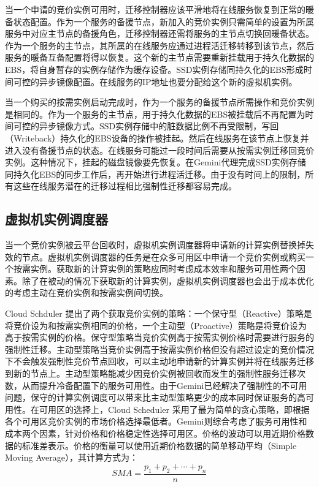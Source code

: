 当一个申请的竞价实例可用时，迁移控制器应该平滑地将在线服务恢复到正常的暖备状态配置。作为一个服务的备援节点，新加入的竞价实例只需简单的设置为所属服务中对应主节点的备援角色，迁移控制器还需将服务的主节点切换回暖备状态。作为一个服务的主节点，其所属的在线服务应通过进程活迁移转移到该节点，然后服务的暖备互备配置将得以恢复。这个新的主节点需要重新挂载用于持久化数据的EBS，将自身暂存的实例存储作为缓存设备。SSD实例存储同持久化的EBS形成时间可控的异步镜像配置。在线服务的IP地址也要分配给这个新的虚拟机实例。

当一个购买的按需实例启动完成时，作为一个服务的备援节点所需操作和竞价实例是相同的。作为一个服务的主节点，用于持久化数据的EBS被挂载后不再配置为时间可控的异步镜像方式。SSD实例存储中的脏数据比例不再受限制，写回（Writeback）持久化的EBS设备的操作被挂起。然后在线服务在该节点上恢复并进入没有备援节点的状态。在线服务可能过一段时间后需要从按需实例迁移回竞价实例。这种情况下，挂起的磁盘镜像要先恢复。在Gemini代理完成SSD实例存储同持久化EBS的同步工作后，再开始进行进程活迁移。由于没有时间上的限制，所有这些在线服务潜在的迁移过程相比强制性迁移都容易完成。

\subsection{虚拟机实例调度器}
当一个竞价实例被云平台回收时，虚拟机实例调度器将申请新的计算实例替换掉失效的节点。虚拟机实例调度器的任务是在众多可用区中申请一个竞价实例或购买一个按需实例。获取新的计算实例的策略应同时考虑成本效率和服务可用性两个因素。除了在被动的情况下获取新的计算实例，虚拟机实例调度器也会出于成本优化的考虑主动在竞价实例和按需实例间切换。

Cloud Schduler \cite{He:2015:CCH:2749246.2749275} 提出了两个获取竞价实例的策略：一个保守型（Reactive）策略是将竞价设为和按需实例相同的价格，一个主动型（Proactive）策略是将竞价设为高于按需实例的价格。保守型策略当竞价实例高于按需实例价格时需要进行服务的强制性迁移。主动型策略当竞价实例高于按需实例价格但没有超过设定的竞价情况下不会触发强制性竞价节点回收，可以主动地申请新的计算实例并将在线服务迁移到新的节点上。主动型策略能减少因竞价实例被回收而发生的强制性服务迁移次数，从而提升冷备配置下的服务可用性。由于Gemini已经解决了强制性的不可用问题，保守的计算实例调度可以带来比主动型策略更少的成本同时保证服务的高可用性。在可用区的选择上，Cloud Scheduler 采用了最为简单的贪心策略，即根据各个可用区竞价实例的市场价格选择最低者。Gemini则综合考虑了服务可用性和成本两个因素，针对价格和价格稳定性选择可用区。价格的波动可以用近期价格数据的标准差表示。价格的衡量可以使用近期价格数据的简单移动平均（Simple Moving Average），其计算方式为：
\begin{equation}
SMA = \frac{p_1 + p_2 + \cdots + p_n}{n}
\end{equation}

